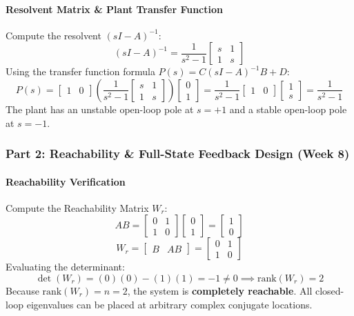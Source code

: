 \documentclass[12pt,onecolumn,twoside ]{article}
\begin{document}
	\paragraph{Resolvent Matrix \& Plant Transfer Function}
	Compute the resolvent $(sI - A)^{-1}$: \[
	(sI - A)^{-1} = \frac{1}{s^2 - 1} \begin{bmatrix} s & 1 \\ 1 & s \end{bmatrix}
	\]
	Using the transfer function formula $P(s) = C(sI - A)^{-1}B + D$: \[
	P(s) = \begin{bmatrix} 1 & 0 \end{bmatrix} \left( \frac{1}{s^2 - 1} \begin{bmatrix} s & 1 \\ 1 & s \end{bmatrix} \right) \begin{bmatrix} 0 \\ 1 \end{bmatrix} = \frac{1}{s^2 - 1} \begin{bmatrix} 1 & 0 \end{bmatrix} \begin{bmatrix} 1 \\ s \end{bmatrix} = \frac{1}{s^2 - 1}
	\]
	The plant has an unstable open-loop pole at $s = +1$ and a stable open-loop pole at $s = -1$.
	
	\subsubsection{Part 2: Reachability \& Full-State Feedback Design (Week 8)}
	\paragraph{Reachability Verification}
	Compute the Reachability Matrix $W_r$: \[
	AB = \begin{bmatrix} 0 & 1 \\ 1 & 0 \end{bmatrix} \begin{bmatrix} 0 \\ 1 \end{bmatrix} = \begin{bmatrix} 1 \\ 0 \end{bmatrix}
	\] \[
	W_r = \begin{bmatrix} B & AB \end{bmatrix} = \begin{bmatrix} 0 & 1 \\ 1 & 0 \end{bmatrix}
	\]
	Evaluating the determinant: \[
	\det(W_r) = (0)(0) - (1)(1) = -1 \neq 0 \implies \text{rank}(W_r) = 2
	\] Because $\text{rank}(W_r) = n = 2$, the system is \textbf{completely reachable}. All closed-loop eigenvalues can be placed at arbitrary complex conjugate locations.
\end{document}
